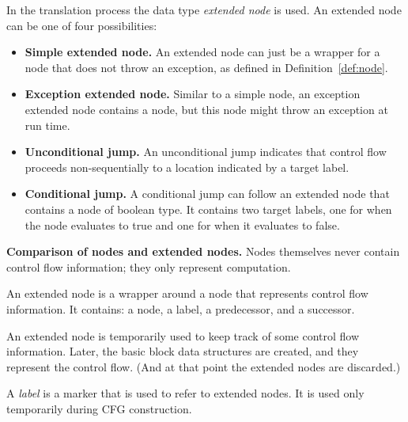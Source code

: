 \begin{definition}
    In the translation process the data type \emph{extended node} is used.
    An extended node can be one of four possibilities:
    \begin{itemize}
        \item \textbf{Simple extended node.} An extended node can just be a
          wrapper for a node that does not throw an exception,
          as defined in Definition~\ref{def:node}.
        \item \textbf{Exception extended node.} Similar to a simple
          node, an exception extended node contains a node, but this
          node might throw an exception at run time.
        \item \textbf{Unconditional jump.} An unconditional jump
          indicates that control flow proceeds non-sequentially to a
          location indicated by a target label.
        \item \textbf{Conditional jump.} A conditional jump can follow
          an extended node that contains a node of boolean type. It
          contains two target labels, one for when the node evaluates to
          true and one for when it evaluates to false.
    \end{itemize}
\end{definition}

\textbf{Comparison of nodes and extended nodes.}
Nodes themselves never contain control flow information; they only
represent computation.

An extended node is a wrapper around a node that represents control flow
information.  It contains:  a node, a label, a predecessor, and a
successor.

An extended node is temporarily used to keep track of some control flow
information.  Later, the basic block data structures are created, and they
represent the control flow.  (And at that point the extended nodes are
discarded.)
\begin{definition}[Label]
    A \emph{label} is a marker that is used to refer to extended
    nodes. It is used only temporarily during CFG construction.
\end{definition}


